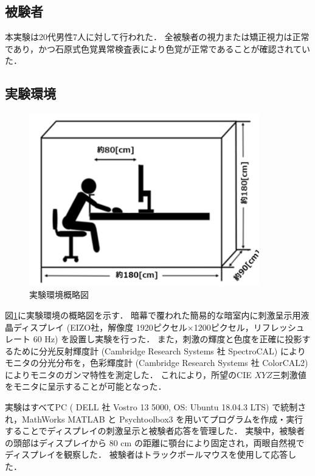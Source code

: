         \subsection{被験者}
            本実験は20代男性7人に対して行われた．
            全被験者の視力または矯正視力は正常であり，かつ石原式色覚異常検査表により色覚が正常であることが確認されていた．

        \subsection{実験環境}

            \begin{figure}[h]
                \centering
                \includegraphics[width=10.0cm]{./img/darkroom_p.png}
                \caption{実験環境概略図}
                \label{darkroom}
            \end{figure}
            
            図\ref{darkroom}に実験環境の概略図を示す．
            暗幕で覆われた簡易的な暗室内に刺激呈示用液晶ディスプレイ (EIZO社，解像度 1920ピクセル$\times$1200ピクセル，リフレッシュレート 60 Hz) を設置し実験を行った．
            また，刺激の輝度と色度を正確に投影するために分光反射輝度計 (Cambridge Research Systems 社 SpectroCAL) によりモニタの分光分布を，色彩輝度計 (Cambridge Research Systems 社 ColorCAL2) によりモニタのガンマ特性を測定した．
            これにより，所望のCIE $XYZ$三刺激値をモニタに呈示することが可能となった．
            
            実験はすべてPC ( DELL 社 Vostro 13 5000, OS: Ubuntu 18.04.3 LTS) で統制され，MathWorks MATLAB と Psychtoolbox3\cite{Psychtoolbox} を用いてプログラムを作成・実行することでディスプレイの刺激呈示と被験者応答を管理した．
            実験中，被験者の頭部はディスプレイから 80 cm の距離に顎台により固定され，両眼自然視でディスプレイを観察した．
            被験者はトラックボールマウスを使用して応答した．

